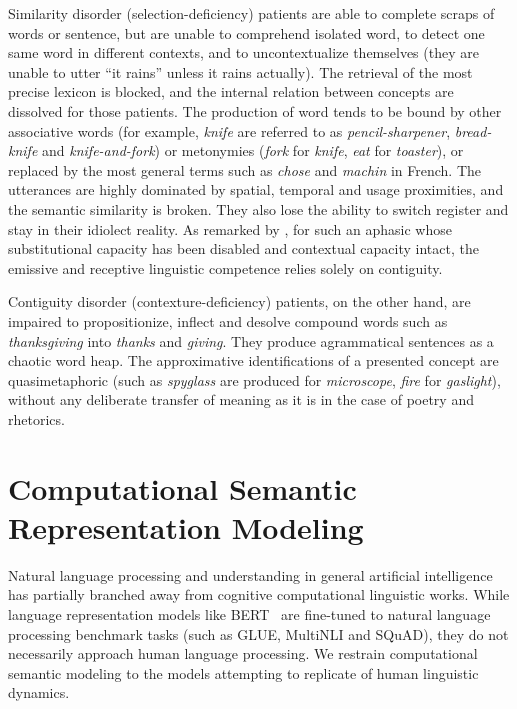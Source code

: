 Similarity disorder (selection-deficiency) patients are able to complete scraps of words or sentence, but are unable to comprehend isolated word, to detect one same word in different contexts, and to uncontextualize themselves (they are unable to utter ``it rains'' unless it rains actually). The retrieval of the most precise lexicon is blocked, and the internal relation between concepts are dissolved for those patients. The production of word tends to be bound by other associative words (for example, \emph{knife} are referred to as \emph{pencil-sharpener}, \emph{bread-knife} and \emph{knife-and-fork}) or metonymies (\emph{fork} for \emph{knife}, \emph{eat} for \emph{toaster}), or replaced by the most general terms such as \emph{chose} and \emph{machin} in French. The utterances are highly dominated by spatial, temporal and usage proximities, and the semantic similarity is broken. They also lose the ability to switch register and stay in their idiolect reality. As remarked by \citeauthor{jakobsonFundamentalsLanguage1963}, for such an aphasic whose substitutional capacity has been disabled and contextual capacity intact, the emissive and receptive linguistic competence relies solely on contiguity. 

Contiguity disorder (contexture-deficiency) patients, on the other hand, are impaired to propositionize, inflect and desolve compound words such as \emph{thanksgiving} into \emph{thanks} and \emph{giving}. They produce agrammatical sentences as a chaotic word heap. The approximative identifications of a presented concept are quasimetaphoric (such as \emph{spyglass} are produced for \emph{microscope}, \emph{fire} for \emph{gaslight}), without any deliberate transfer of meaning as it is in the case of poetry and rhetorics. 


\section{Computational Semantic Representation Modeling}

Natural language processing and understanding in general artificial intelligence has partially branched away from cognitive computational linguistic works. While language representation models like BERT~\parencite{devlinBERTPretrainingDeep2018} are fine-tuned to natural language processing benchmark tasks (such as GLUE, MultiNLI and SQuAD), they do not necessarily approach human language processing. We restrain computational semantic modeling to the models attempting to replicate of human linguistic dynamics. 

